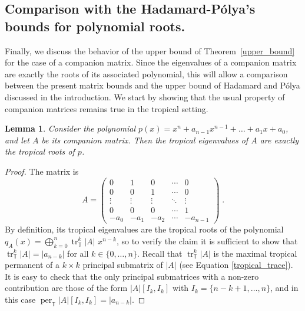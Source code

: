 \documentclass[a4paper]{amsart}
\theoremstyle{definition}
\theoremstyle{plain}
\newtheorem{lem}[thm]{Lemma}
\theoremstyle{remark}
\begin{document}
\subsection{Comparison with the Hadamard-P\'olya's bounds for polynomial roots.}
Finally, we discuss the behavior of the upper bound of Theorem~\ref{upper_bound} for the case of a companion matrix. Since the eigenvalues of a companion matrix are exactly the roots of its associated polynomial,
this will allow a comparison between the present matrix bounds and
the upper bound of Hadamard and P\'olya discussed
in the introduction. 
We start by showing that the usual property of companion matrices remains true in the tropical setting.
\begin{lem}
Consider the polynomial $p(x) = x^n + a_{n-1} x^{n-1} + \dots + a_1 x + a_0$, and let $A$ be its companion matrix.
Then the tropical eigenvalues of $A$ are exactly the tropical roots of $p$.
\end{lem}
\begin{proof}
The matrix is
\[
A = 
\begin{pmatrix}
	0 	& 1 	& 0 	& \cdots& 0	\\
	0 	& 0	& 1	& \cdots& 0	\\
	\vdots 	& \vdots& \vdots& \ddots& \vdots\\
	0 	& 0	& 0	& \cdots& 1	\\
	-a_0	&-a_1	&-a_2	& \cdots&-a_{n-1}
\end{pmatrix} \;  .
\]
By definition, its tropical eigenvalues are the tropical roots of the polynomial $q_A(x) = \bigoplus_{k=0}^n \operatorname{tr}_{{\mathbb{T}}}^k \!|A| \,\,x^{n-k}$,
so to verify the claim it is sufficient to show that $\operatorname{tr}_{{\mathbb{T}}}^k \!|A| = |a_{n-k}|$ for all $k\in\{0,\dots,n\}$.
Recall that $\operatorname{tr}_{{\mathbb{T}}}^k \!|A|$ is the maximal tropical
permanent 
of a $k \times k$ principal submatrix of $|A|$
(see Equation \eqref{tropical_trace}).
It is easy to check that the only principal submatrices 
with a non-zero contribution
are those of the form $|A|[I_k,I_k]$ with $I_k = \{n-k+1,\dots,n\}$,
and in this case
$\operatorname{per}_{{\mathbb{T}}}|A|[I_k,I_k]=
|a_{n-k}|$.
\end{proof}
\end{document}

